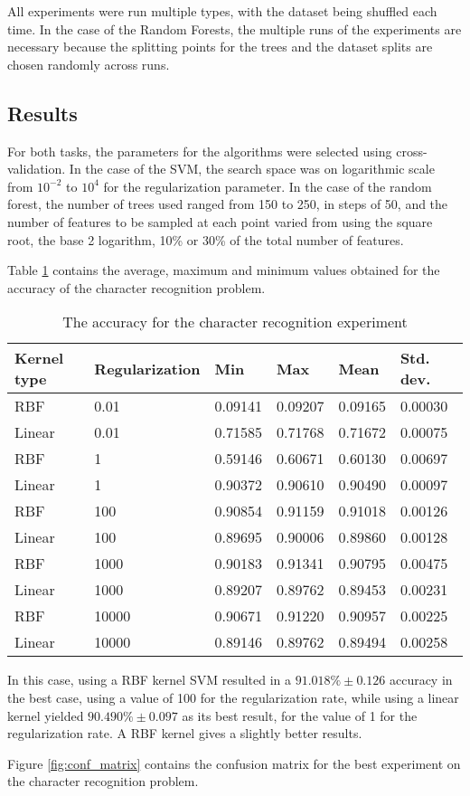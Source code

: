 All experiments were run multiple types, with the dataset being shuffled each time. In the case of the Random Forests, the multiple runs of the experiments are necessary because the splitting points for the trees and the dataset splits are chosen randomly across runs. 
\subsection{Results}

For both tasks, the parameters for the algorithms were selected using cross-validation. In the case of the SVM, the search space was on logarithmic scale from $10^{-2}$ to $10^4$ for the regularization parameter. In the case of the random forest, the number of trees used ranged from 150 to 250, in steps of 50, and the number of features to be sampled at each point varied from using the square root, the base 2 logarithm, 10\% or 30\% of the total number of features. 

Table \ref{table:recog_values} contains the average, maximum and minimum values obtained for the accuracy of the character recognition problem.

\begin{table}[h]
\caption{The accuracy for the character recognition experiment}
\label{table:recog_values}
\begin{tabular}{llllll}
\hline
Kernel type & Regularization & Min     & Max     & Mean    & Std. dev. \\ \hline
RBF & 0.01 & 0.09141 & 0.09207 & 0.09165 & 0.00030 \\ 
Linear & 0.01 & 0.71585 & 0.71768 & 0.71672 & 0.00075 \\ 
RBF & 1 & 0.59146 & 0.60671 & 0.60130 & 0.00697 \\ 
Linear & 1 & 0.90372 & 0.90610 & 0.90490 & 0.00097 \\ 
RBF & 100 & 0.90854 & 0.91159 & 0.91018 & 0.00126 \\ 
Linear & 100 & 0.89695 & 0.90006 & 0.89860 & 0.00128 \\ 
RBF & 1000 & 0.90183 & 0.91341 & 0.90795 & 0.00475 \\ 
Linear & 1000 & 0.89207 & 0.89762 & 0.89453 & 0.00231 \\ 
RBF & 10000 & 0.90671 & 0.91220 & 0.90957 & 0.00225 \\ 
Linear & 10000 & 0.89146 & 0.89762 & 0.89494 & 0.00258 \\ \hline
\end{tabular}
\end{table}

In this case, using a RBF kernel SVM resulted in a $ 91.018\% \pm 0.126 $ accuracy in the best case, using a value of 100 for the regularization rate, while using a linear kernel yielded $ 90.490\% \pm 0.097 $ as its best result, for the value of 1 for the regularization rate. A RBF kernel gives a slightly better results.

Figure \ref{fig:conf_matrix} contains the confusion matrix for the best experiment on the character recognition problem.

